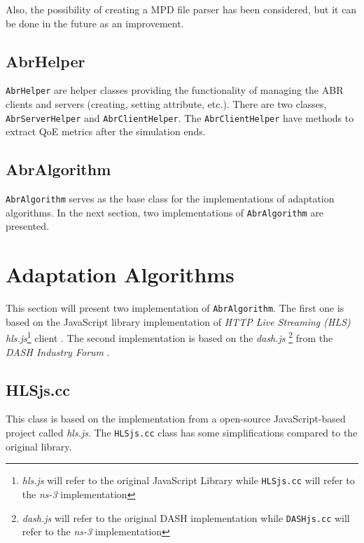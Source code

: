 Also, the possibility of 
creating a MPD file parser has been considered, but it can be done in the future as an improvement.

\subsection{AbrHelper}

\texttt{AbrHelper} are helper classes providing the functionality of managing the ABR clients and 
servers (creating, setting attribute, etc.). There are two classes, \texttt{AbrServerHelper}
and \texttt{AbrClientHelper}. The \texttt{AbrClientHelper} have methods to extract QoE metrics 
after the simulation ends.

\subsection{AbrAlgorithm}

\texttt{AbrAlgorithm} serves as the base class for the implementations of adaptation algorithms.
In the next section, two implementations of \texttt{AbrAlgorithm} are presented.

\section{Adaptation Algorithms}
\label{sec:abralgo}

This section will present two implementation of \texttt{AbrAlgorithm}. The first one
is based on the JavaScript library implementation of \textit{HTTP Live Streaming (HLS) hls.js}\footnote{\textit{hls.js} will refer to the original JavaScript Library while
\texttt{HLSjs.cc} will refer to the \textit{ns-3} implementation} client \cite{hls3}.
The second implementation is based on the \textit{dash.js} 
\footnote{\textit{dash.js} will refer to the original DASH implementation while
\texttt{DASHjs.cc} will refer to the \textit{ns-3} implementation}
from the \textit{DASH Industry Forum} \cite{dash3}.

\subsection{HLSjs.cc}
This class is based on the implementation from a open-source JavaScript-based project called
\textit{hls.js}.
The \texttt{HLSjs.cc} class has some simplifications compared to the original
library.

